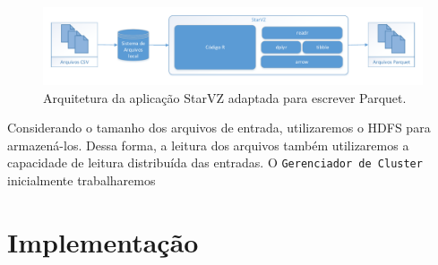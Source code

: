 \begin{figure}[ht]
 \centerline{\includegraphics[width=1\textwidth]{./img/starvz-arch-arrow.pdf}}
 \caption{Arquitetura da aplicação StarVZ adaptada para escrever Parquet.}
 \label{fig:starvz-app-arrow}
\end{figure}

Considerando o tamanho dos arquivos de entrada, utilizaremos o HDFS para armazená-los. Dessa forma, a leitura dos arquivos 
também utilizaremos a capacidade de leitura distribuída das entradas. O \texttt{Gerenciador de Cluster} inicialmente trabalharemos


\section{Implementação} \label{sect:implement}
